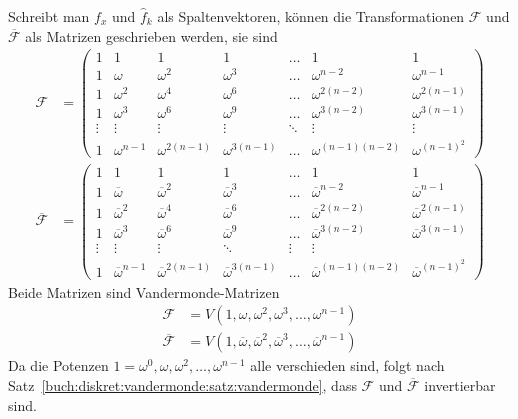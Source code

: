 Schreibt man $f_x$ und $\hat{f}_k$ als Spaltenvektoren, können die
Transformationen $\mathscr{F}$ und $\overline{\mathscr{F}}$ als
Matrizen geschrieben werden, sie sind
\bgroup
\def\v{\vdots}
\def\o{\overline{\omega}}
\renewcommand\arraystretch{1.15}
\begin{align*}
\mathscr{F}
&=
\begin{pmatrix}
 1&     1      &       1&       1&\dots &           1   &           1   \\
 1&\omega      &\omega^2&\omega^3&\dots &\omega^{n-2}   &\omega^{n-1}   \\
 1&\omega^2    &\omega^4&\omega^6&\dots &\omega^{2(n-2)}&\omega^{2(n-1)}\\
 1&\omega^3    &\omega^6&\omega^9&\dots &\omega^{3(n-2)}&\omega^{3(n-1)}\\[-2pt]
\v&\v&\v&\v&\ddots&\v&\v\\
 1&\omega^{n-1}&\omega^{2(n-1)}&\omega^{3(n-1)}&\dots &\omega^{(n-1)(n-2)}&\omega^{(n-1)^2}
\end{pmatrix}
\\
\overline{\mathscr{F}}
&=
\begin{pmatrix}
 1&     1  &       1   &   1       &\dots &           1   &       1   \\
 1&\o      &\o^2       &\o^3       &\dots &\o^{n-2}       &\o^{n-1}   \\
 1&\o^2    &\o^4       &\o^6       &\dots &\o^{2(n-2)}    &\o^{2(n-1)}\\
 1&\o^3    &\o^6       &\o^9       &\dots &\o^{3(n-2)}    &\o^{3(n-1)}\\[-2pt]
\v&\v&\v&\ddots&\v&\v\\
 1&\o^{n-1}&\o^{2(n-1)}&\o^{3(n-1)}&\dots &\o^{(n-1)(n-2)}&\o^{(n-1)^2}
\end{pmatrix}
\end{align*}
\egroup
Beide Matrizen sind Vandermonde-Matrizen
\begin{align}
\mathscr{F}
&=
V(1,\omega,\omega^2,\omega^3,\dots,\omega^{n-1})
\label{buch:diskret:vandermonde:eqn:vanderfourier}
\\
\overline{\mathscr{F}}
&=
V(1,\overline{\omega},\overline{\omega}^2,\overline{\omega}^3,\dots,\overline{\omega}^{n-1})
\label{buch:diskret:vandermonde:eqn:vanderifourier}
\end{align}
Da die Potenzen $1=\omega^0,\omega,\omega^2,\dots,\omega^{n-1}$ alle
verschieden sind, folgt nach
Satz~\ref{buch:diskret:vandermonde:satz:vandermonde},
dass $\mathscr{F}$ und $\overline{\mathscr{F}}$ invertierbar sind.
